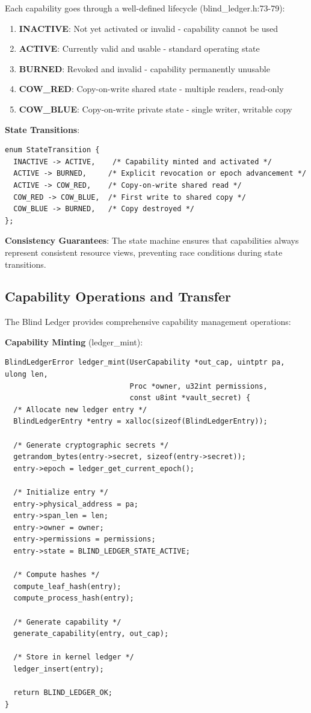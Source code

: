 \documentclass[11pt,letterpaper]{article}
\begin{document}
Each capability goes through a well-defined lifecycle (blind\_ledger.h:73-79):

\begin{enumerate}
\item \textbf{INACTIVE}: Not yet activated or invalid - capability cannot be used
\item \textbf{ACTIVE}: Currently valid and usable - standard operating state
\item \textbf{BURNED}: Revoked and invalid - capability permanently unusable
\item \textbf{COW\_RED}: Copy-on-write shared state - multiple readers, read-only
\item \textbf{COW\_BLUE}: Copy-on-write private state - single writer, writable copy
\end{enumerate}

\textbf{State Transitions}:

\begin{lstlisting}
enum StateTransition {
  INACTIVE -> ACTIVE,    /* Capability minted and activated */
  ACTIVE -> BURNED,     /* Explicit revocation or epoch advancement */
  ACTIVE -> COW_RED,    /* Copy-on-write shared read */
  COW_RED -> COW_BLUE,  /* First write to shared copy */
  COW_BLUE -> BURNED,   /* Copy destroyed */
};
\end{lstlisting}

\textbf{Consistency Guarantees}: The state machine ensures that capabilities always represent consistent resource views, preventing race conditions during state transitions.

\subsection{Capability Operations and Transfer}

The Blind Ledger provides comprehensive capability management operations:

\textbf{Capability Minting} (ledger\_mint):

\begin{lstlisting}
BlindLedgerError ledger_mint(UserCapability *out_cap, uintptr pa, ulong len,
                             Proc *owner, u32int permissions,
                             const u8int *vault_secret) {
  /* Allocate new ledger entry */
  BlindLedgerEntry *entry = xalloc(sizeof(BlindLedgerEntry));
  
  /* Generate cryptographic secrets */
  getrandom_bytes(entry->secret, sizeof(entry->secret));
  entry->epoch = ledger_get_current_epoch();
  
  /* Initialize entry */
  entry->physical_address = pa;
  entry->span_len = len;
  entry->owner = owner;
  entry->permissions = permissions;
  entry->state = BLIND_LEDGER_STATE_ACTIVE;
  
  /* Compute hashes */
  compute_leaf_hash(entry);
  compute_process_hash(entry);
  
  /* Generate capability */
  generate_capability(entry, out_cap);
  
  /* Store in kernel ledger */
  ledger_insert(entry);
  
  return BLIND_LEDGER_OK;
}
\end{lstlisting}
\end{document}
